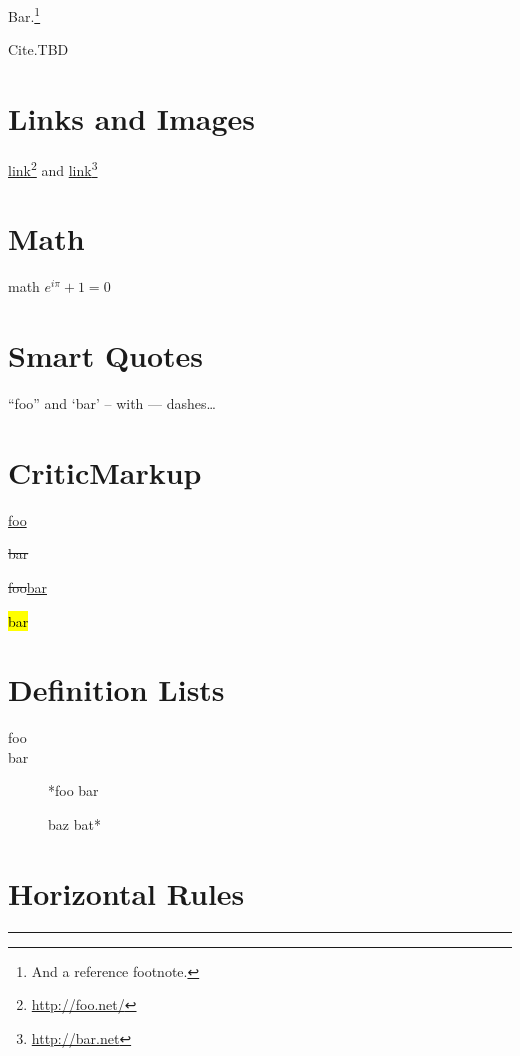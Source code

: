 Bar.\footnote{And a reference footnote.}

Cite.\citesyntax TBD

\part{Links and Images }
\label{linksandimages}

\href{http://foo.net/}{link}\footnote{\href{http://foo.net/}{http:/\slash foo.net\slash }} and \href{http://bar.net}{link}\footnote{\href{http://bar.net}{http:/\slash bar.net}}


\part{Math }
\label{math}

math ${e}^{i\pi }+1=0$

\part{Smart Quotes }
\label{smartquotes}

``foo'' and `bar' -- with --- dashes{\ldots}

\part{CriticMarkup }
\label{criticmarkup}

\underline{foo}

\sout{bar}

\sout{foo}\underline{bar}


\hl{bar}

\part{Definition Lists }
\label{definitionlists}

\begin{description}
\item[foo]

\item[bar]

*foo bar

baz bat*
\end{description}

\part{Horizontal Rules }
\label{horizontalrules}

\begin{center}\rule{3in}{0.4pt}\end{center}
